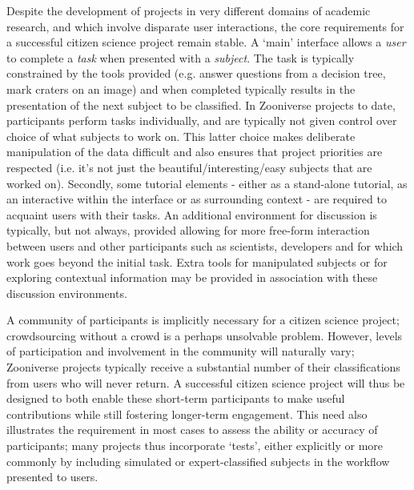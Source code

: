 \documentclass{sigchi}
\begin{document}
Despite the development of projects in very different domains of academic research, and which involve disparate user interactions, the core requirements for a successful citizen science project remain stable. A `main' interface allows a \emph{user} to complete a \emph{task} when presented with a \emph{subject}. The task is typically constrained by the tools provided (e.g. answer questions from a decision tree, mark craters on an image) and when completed typically results in the presentation of the next subject to be classified. In Zooniverse projects to date, participants perform tasks individually, and are typically not given control over choice of what subjects to work on. This latter choice makes deliberate manipulation of the data difficult and also ensures that project priorities are respected (i.e. it's not just the beautiful/interesting/easy subjects that are worked on). Secondly, some tutorial elements - either as a stand-alone tutorial, as an interactive within the interface or as surrounding context - are required to acquaint users with their tasks. An additional environment for discussion is typically, but not always, provided allowing for more free-form interaction between users and other participants such as scientists, developers and for which work goes beyond the initial task. Extra tools for manipulated subjects or for exploring contextual information may be provided in association with these discussion environments. 


A community of participants is implicitly necessary for a citizen science project; crowdsourcing without a crowd is a perhaps unsolvable problem. However, levels of participation and involvement in the community will naturally vary; Zooniverse projects typically receive a substantial number of their classifications from users who will never return. A successful citizen science project will thus be designed to both enable these short-term participants to make useful contributions while still fostering longer-term engagement. This need also illustrates the requirement in most cases to assess the ability or accuracy of participants; many projects thus incorporate `tests', either explicitly or more commonly by including simulated or expert-classified subjects in the workflow presented to users. 
\end{document}
